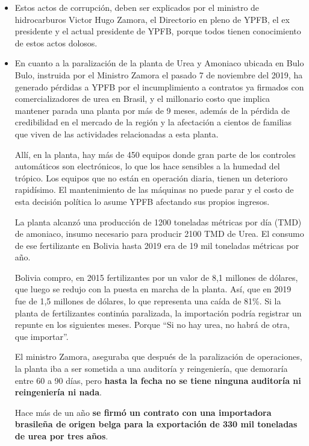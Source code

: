 \documentclass[a4paper, nobind]{templates/ociamthesis}
\begin{document}
\begin{itemize}
\item
  Estos actos de corrupción, deben ser explicados por el ministro de hidrocarburos Victor Hugo Zamora, el Directorio en pleno de YPFB, el ex presidente y el actual presidente de YPFB, porque todos tienen conocimiento de estos actos dolosos.
\item
  En cuanto a la paralización de la planta de Urea y Amoniaco ubicada en Bulo Bulo, instruida por el Ministro Zamora el pasado 7 de noviembre del 2019, ha generado pérdidas a YPFB por el incumplimiento a contratos ya firmados con comercializadores de urea en Brasil, y el millonario costo que implica mantener parada una planta por más de 9 meses, además de la pérdida de credibilidad en el mercado de la región y la afectación a cientos de familias que viven de las actividades relacionadas a esta planta.

  Allí, en la planta, hay más de 450 equipos donde gran parte de los controles automáticos son electrónicos, lo que los hace sensibles a la humedad del trópico. Los equipos que no están en operación diaria, tienen un deterioro rapidísimo. El mantenimiento de las máquinas no puede parar y el costo de esta decisión política lo asume YPFB afectando sus propios ingresos.

  La planta alcanzó una producción de 1200 toneladas métricas por día (TMD) de amoniaco, insumo necesario para producir 2100 TMD de Urea. El consumo de ese fertilizante en Bolivia hasta 2019 era de 19 mil toneladas métricas por año.

  Bolivia compro, en 2015 fertilizantes por un valor de 8,1 millones de dólares, que luego se redujo con la puesta en marcha de la planta. Así, que en 2019 fue de 1,5 millones de dólares, lo que representa una caída de 81\%. Si la planta de fertilizantes continúa paralizada, la importación podría registrar un repunte en los siguientes meses. Porque ``Si no hay urea, no habrá de otra, que importar''.

  El ministro Zamora, aseguraba que después de la paralización de operaciones, la planta iba a ser sometida a una auditoría y reingeniería, que demoraría entre 60 a 90 días, pero \textbf{hasta la fecha no se tiene ninguna auditoría ni reingeniería ni nada}.

  Hace más de un año \textbf{se firmó un contrato con una importadora brasileña de origen belga para la exportación de 330 mil toneladas de urea por tres años}.


\end{itemize}
\end{document}
